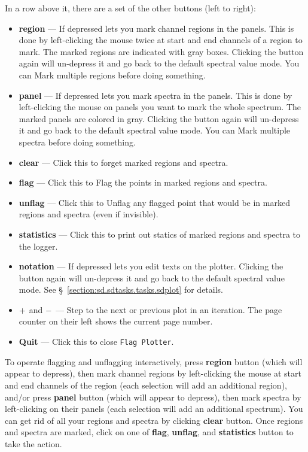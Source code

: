 In a row above it, there are a set of the other buttons (left to right):
\begin{itemize}
\item {\bf region} --- If depressed lets you mark channel regions
  in the panels. This is done by left-clicking the mouse twice at start 
  and end channels of a region to mark. The marked regions are indicated 
  with gray boxes. Clicking the button again will un-depress it and go back 
  to the default spectral value mode.
  You can Mark multiple regions before doing something.
\item {\bf panel} --- If depressed lets you mark spectra in the panels.
  This is done by left-clicking the mouse on panels you want to mark the 
  whole spectrum. The marked panels are colored in gray.
  Clicking the button again will un-depress it and go back 
  to the default spectral value mode.
  You can Mark multiple spectra before doing something.
\item {\bf clear} --- Click this to forget marked regions and spectra.
\item {\bf flag} --- Click this to Flag the points in marked regions and spectra.
\item {\bf unflag} --- Click this to Unflag any flagged point that
  would be in marked regions and spectra (even if invisible).
\item {\bf statistics} --- Click this to print out statics of marked regions 
  and spectra to the logger.
\item {\bf notation} --- If depressed lets you edit texts on the plotter. 
  Clicking the button again will un-depress it and go back 
  to the default spectral value mode.
  See \S~\ref{section:sd.sdtasks.tasks.sdplot} for details.
\item $ {\bf +} $ and $ {\bf -} $ --- Step to the next or previous plot 
  in an iteration. The page counter on their left shows the current page
  number.
\item {\bf Quit} --- Click this to close {\tt Flag Plotter}.
\end {itemize}

To operate flagging and unflagging interactively,
press {\bf region} button (which will appear to depress), 
then mark channel regions by left-clicking the mouse at start 
and end channels of the region (each selection will add an additional region), 
and/or press {\bf panel} button (which will appear to depress),
then mark spectra by left-clicking on their panels (each selection 
will add an additional spectrum).
You can get rid of all your regions and spectra by clicking {\bf clear} 
button.
Once regions and spectra are marked, click on one of {\bf flag},
{\bf unflag}, and {\bf statistics} button to take the action.


